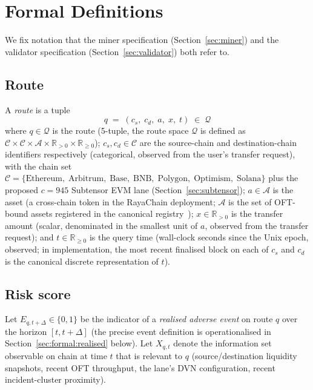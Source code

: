 \documentclass[11pt,a4paper]{article}
\begin{document}
\section{Formal Definitions}\label{sec:formal}

We fix notation that the miner specification (Section~\ref{sec:miner}) and the validator
specification (Section~\ref{sec:validator}) both refer to.

\subsection{Route}\label{sec:formal:route}

A \emph{route} is a tuple
\begin{equation}
  q \;=\; (c_s,\; c_d,\; a,\; x,\; t) \;\in\; \mathcal{Q}
  \label{eq:route}
\end{equation}
where $q \in \mathcal{Q}$ is the route (5-tuple, the route space $\mathcal{Q}$ is
defined as $\mathcal{C} \times \mathcal{C} \times \mathcal{A} \times
\mathbb{R}_{>0} \times \mathbb{R}_{\ge 0}$); $c_s, c_d \in \mathcal{C}$ are the
source-chain and destination-chain identifiers respectively (categorical, observed
from the user's transfer request), with the chain set
\(
  \mathcal{C} = \{\text{Ethereum},\; \text{Arbitrum},\; \text{Base},\; \text{BNB},\;
  \text{Polygon},\; \text{Optimism},\; \text{Solana}\}
\)
plus the proposed $c = 945$ Subtensor EVM lane (Section~\ref{sec:subtensor});
$a \in \mathcal{A}$ is the asset (a cross-chain token in the RayaChain deployment;
$\mathcal{A}$ is the set of OFT-bound assets registered in the canonical
registry~\cite{rayachain2026registry}); $x \in \mathbb{R}_{>0}$ is the transfer
amount (scalar, denominated in the smallest unit of $a$, observed from the
transfer request); and $t \in \mathbb{R}_{\ge 0}$ is the query time
(wall-clock seconds since the Unix epoch, observed; in implementation, the
most recent finalised block on each of $c_s$ and $c_d$ is the canonical
discrete representation of $t$).

\subsection{Risk score}\label{sec:formal:score}

Let $E_{q, t+\Delta} \in \{0, 1\}$ be the indicator of a \emph{realised adverse event}
on route $q$ over the horizon $[t, t + \Delta]$ (the precise event definition is
operationalised in Section~\ref{sec:formal:realised} below). Let $X_{q, t}$ denote the
information set observable on chain at time $t$ that is relevant to $q$ (source/destination
liquidity snapshots, recent OFT throughput, the lane's DVN configuration, recent
incident-cluster proximity).
\end{document}
